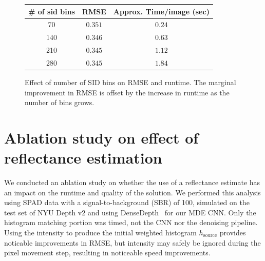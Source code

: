 \documentclass[runningheads]{llncs}
\begin{document}
\begin{figure}[H]
  \centering
  \begin{tabular}{c|cc}
    \toprule
    \# of sid bins & RMSE & Approx. Time/image (sec) \\
    \midrule
    70  & $0.351$ & $0.24$ \\
    140 & $0.346$ & $0.63$ \\
    210 & $0.345$ & $1.12$ \\
    280 & $0.345$ & $1.84$ \\
    \bottomrule
  \end{tabular}
  \caption{Effect of number of SID bins on RMSE and runtime. The marginal
    improvement in RMSE is offset by the increase in runtime as the number of
    bins grows.}
  \label{fig:sid_ablation}
\end{figure}


\section{Ablation study on effect of reflectance estimation}
We conducted an ablation study on whether the use of a reflectance
estimate has an impact on the runtime and quality of the solution.
We performed this analysis using SPAD
data with a signal-to-background (SBR) of 100, simulated on the test set of NYU
Depth v2 and using DenseDepth~\cite{Alhashim2018} for our MDE CNN.
Only the histogram matching portion was timed, not the CNN nor the denoising
pipeline. Using the intensity to produce the initial weighted histogram
$h_{\text{source}} $ provides noticable improvements
in RMSE, but intensity may safely be ignored during the pixel movement step,
resulting in noticeable speed improvements.
\end{document}
